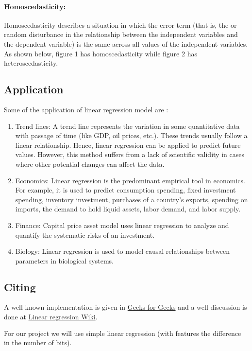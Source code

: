 \paragraph{Homoscedasticity:}
Homoscedasticity describes a situation in which the error term (that is, the  or random disturbance in the relationship between the independent variables and the dependent variable) is the same across all values of the independent variables. As shown below, figure 1 has homoscedasticity while figure 2 has heteroscedasticity.

\subsection{Application}
Some of the application of linear regression model are :

\begin{enumerate}
\item Trend lines: A trend line represents the variation in some quantitative data with passage of time (like GDP, oil prices, etc.). These trends usually follow a linear relationship. Hence, linear regression can be applied to predict future values. However, this method suffers from a lack of scientific validity in cases where other potential changes can affect the data.
\item Economics: Linear regression is the predominant empirical tool in economics. For example, it is used to predict consumption spending, fixed investment spending, inventory investment, purchases of a country's exports, spending on imports, the demand to hold liquid assets, labor demand, and labor supply.
\item Finance: Capital price asset model uses linear regression to analyze and quantify the systematic risks of an investment.
\item Biology: Linear regression is used to model causal relationships between parameters in biological systems.
\end{enumerate}

\subsection{Citing}
A well known implementation is given in \href{https://www.geeksforgeeks.org/linear-regression-python-implementation/}{Geeks-for-Geeks} and a well discussion is done at \href{https://en.wikipedia.org/wiki/Linear_regression}{Linear regression Wiki}.

For our project we will use simple linear regression (with features the difference in the number of bits).

